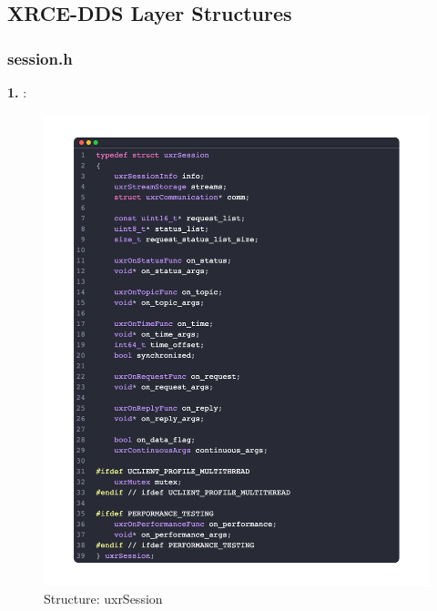 \subsection{XRCE-DDS Layer Structures}
\subsubsection{session.h}
\textbf{1. }: 
\begin{figure}[htbp!]
    \centering
    \includegraphics[width=1\linewidth]{Sec/Implementation/uxr/fig/uxrSession.png}
    \caption{Structure: uxrSession}
    \vspace{-0.1in}
\end{figure}

